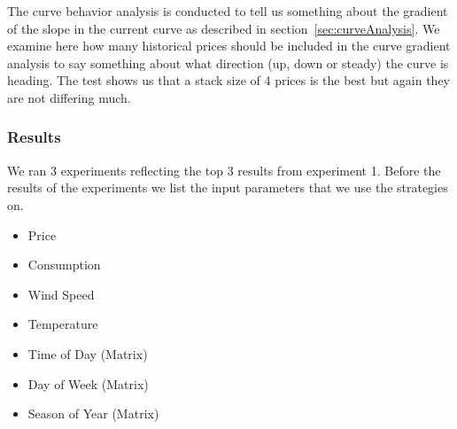 The curve behavior analysis is conducted to tell us something about the gradient of the slope in the current curve as described in section~\ref{sec:curveAnalysis}. We examine here how many historical prices should be included in the curve gradient analysis to say something about what direction (up, down or steady) the curve is heading. The test shows us that a stack size of 4 prices is the best but again they are not differing much.

\subsubsection{Results}
We ran 3 experiments reflecting the top 3 results from experiment 1. Before the results of the experiments we list the input parameters that we use the strategies on. 

\begin{itemize}
	\item Price
	\item Consumption
	\item Wind Speed
	\item Temperature
	\item Time of Day (Matrix)
	\item Day of Week (Matrix)
	\item Season of Year (Matrix)
\end{itemize}

